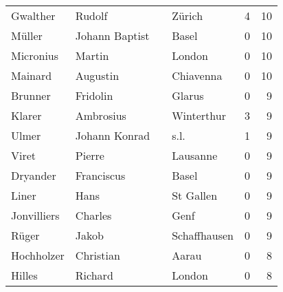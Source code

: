 \begin{center}
\begin{tiny}
\begin{longtabu}{llllrr}
                 Gwalther &                             Rudolf &             &                                      Zürich &          4 &        10 \\
                   Müller &                     Johann Baptist &             &                                       Basel &          0 &        10 \\
                Micronius &                             Martin &             &                                      London &          0 &        10 \\
                  Mainard &                           Augustin &             &                                   Chiavenna &          0 &        10 \\
                  Brunner &                           Fridolin &             &                                      Glarus &          0 &         9 \\
                   Klarer &                          Ambrosius &             &                                  Winterthur &          3 &         9 \\
                    Ulmer &                      Johann Konrad &             &                                        s.l. &          1 &         9 \\
                    Viret &                             Pierre &             &                                    Lausanne &          0 &         9 \\
                 Dryander &                         Franciscus &             &                                       Basel &          0 &         9 \\
                    Liner &                               Hans &             &                                   St Gallen &          0 &         9 \\
              Jonvilliers &                            Charles &             &                                        Genf &          0 &         9 \\
                    Rüger &                              Jakob &             &                                Schaffhausen &          0 &         9 \\
               Hochholzer &                          Christian &             &                                       Aarau &          0 &         8 \\
                   Hilles &                            Richard &             &                                      London &          0 &         8 \\

\end{longtabu}
\end{tiny}
\end{center}
